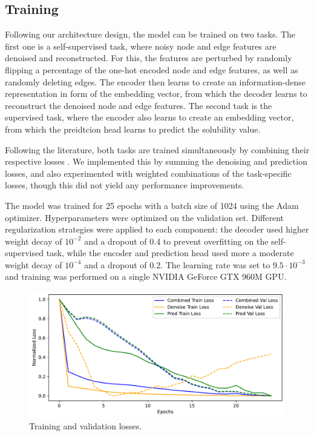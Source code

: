 \documentclass[11pt,a4paper]{article}
\begin{document}
\subsection{Training}

Following our architecture design, the model can be trained on two tasks. The first one is a self-supervised task, where noisy node and edge features are denoised and reconstructed. For this, the features are perturbed by randomly flipping a percentage of the one-hot encoded node and edge features, as well as randomly deleting edges. The encoder then learns to create an information-dense representation in form of the embedding vector, from which the decoder learns to reconstruct the denoised node and edge features. The second task is the supervised task, where the encoder also learns to create an embedding vector, from which the preidtcion head learns to predict the solubility value.

Following the literature, both tasks are trained simultaneously by combining their respective losses \cite{cui2025online, wang2022test}. We implemented this by summing the denoising and prediction losses, and also experimented with weighted combinations of the task-specific losses, though this did not yield any performance improvements.

The model was trained for 25 epochs with a batch size of 1024 using the Adam optimizer. Hyperparameters were optimized on the validation set. Different regularization strategies were applied to each component: the decoder used higher weight decay of $10^{-2}$ and a dropout of 0.4 to prevent overfitting on the self-supervised task, while the encoder and prediction head used more a moderate weight decay of $10^{-4}$ and a dropout of 0.2. The learning rate was set to $9.5 \cdot 10^{-3}$ and training was performed on a single NVIDIA GeForce GTX 960M GPU.

\begin{figure}[htbp]
        \centering
        \includegraphics[width=1\textwidth]{loss_plot.pdf}
        \caption{Training and validation losses.}
        \label{fig:loss_plot}
\end{figure}
\end{document}
